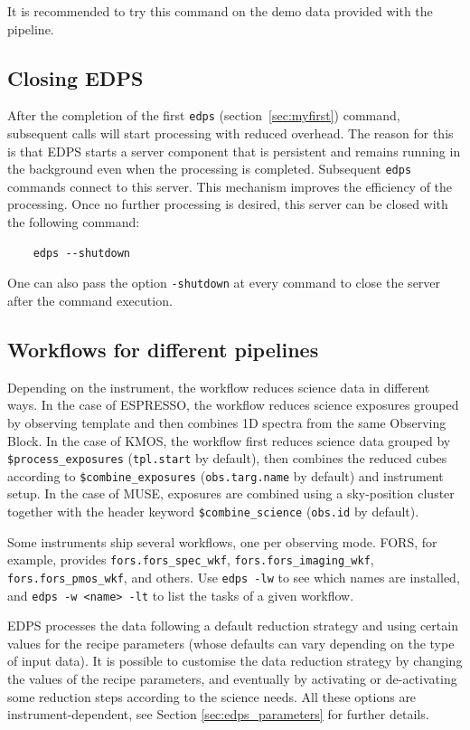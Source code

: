 It is recommended to try this command on the demo data provided with the pipeline. 


\subsection{Closing EDPS}
\label{sec:edps_close}

After the  completion of the first {\tt edps} (section~\ref{sec:myfirst}) command, subsequent calls will start processing with reduced overhead. The reason for this is that EDPS starts a server component that is persistent and remains running in the background even when the processing is completed. Subsequent {\tt edps} commands connect to this server. This mechanism improves the efficiency of the processing. Once no further processing is desired, this server can be closed with the following command:

\begin{verbatim}
    edps --shutdown
\end{verbatim}

One can also pass the option {\tt -shutdown} at every command to close the server after the command execution.




\subsection{Workflows for different pipelines}
 
Depending on the instrument, the workflow reduces science data in different ways. In the case of ESPRESSO, the workflow reduces science exposures grouped by observing template and then combines 1D spectra from the same Observing Block. In the case of KMOS, the workflow first reduces science data grouped by {\tt \$process\_exposures} ({\tt tpl.start} by default), then combines the reduced cubes according to {\tt \$combine\_exposures} ({\tt obs.targ.name} by default) and instrument setup. In the case of MUSE, exposures are combined using a sky-position cluster together with the header keyword {\tt \$combine\_science} ({\tt obs.id} by default).

Some instruments ship several workflows, one per observing mode. FORS, for example, provides {\tt fors.fors\_spec\_wkf}, {\tt fors.fors\_imaging\_wkf}, {\tt fors.fors\_pmos\_wkf}, and others. Use {\tt edps -lw} to see which names are installed, and {\tt edps -w <name> -lt} to list the tasks of a given workflow.

EDPS processes the data following a default reduction strategy and using certain values for the recipe parameters (whose defaults can vary depending on the type of input data). It is possible to customise the data reduction strategy by changing the values of the recipe parameters, and eventually by activating or de-activating some reduction steps according to the science needs. All these options are instrument-dependent, see Section \ref{sec:edps_parameters} for further details.


